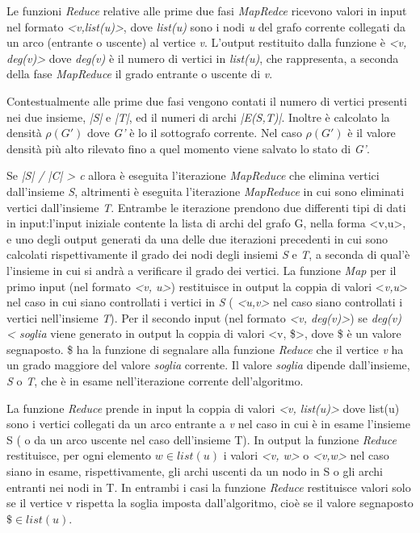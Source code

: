 \documentclass[LaM,binding=0.6cm]{sapthesis}
\begin{document}
Le funzioni \textit{Reduce} relative alle prime due fasi \textit{MapRedce} ricevono valori in input nel formato \textit{<v,list(u)>}, dove \textit{list(u)} sono i nodi  \textit{u} del grafo corrente collegati da un arco (entrante o uscente) al vertice \textit{v}. L'output restituito dalla funzione è \textit{<v, deg(v)>} dove \textit{deg(v)} è il numero di vertici in \textit{list(u)}, che rappresenta, a seconda della fase \textit{MapReduce} il grado entrante o uscente di \textit{v}.

Contestualmente alle prime due fasi vengono contati il numero di vertici presenti nei due insieme, \textit{|S|} e \textit{|T|}, ed il numeri di archi \textit{|E(S,T)|}. Inoltre è calcolato la densità $\rho(G')$ dove \textit{G'} è lo il sottografo corrente. Nel caso $\rho(G')$ è il valore densità più alto rilevato fino a quel momento viene salvato lo stato di \textit{G'}.

Se \textit{|S| / |C| > c} allora è eseguita l'iterazione \textit{MapReduce} che elimina vertici dall'insieme \textit{S}, altrimenti è eseguita l'iterazione \textit{MapReduce} in cui sono eliminati vertici dall'insieme \textit{T}. Entrambe le iterazione prendono due differenti tipi di dati in input:l'input iniziale contente la lista di archi del grafo G, nella forma <v,u>, e uno degli output generati da una delle due iterazioni precedenti in cui sono calcolati rispettivamente il grado dei nodi degli insiemi \textit{S} e \textit{T}, a seconda di qual'è l'insieme in cui si andrà a verificare il grado dei vertici.
La funzione \textit{Map} per il primo input (nel formato \textit{<v, u>}) restituisce in output la coppia di valori <\textit{v,u}> nel caso in cui siano controllati i vertici in \textit{S} ( \textit{<u,v>} nel caso siano controllati i vertici nell'insieme \textit{T}). 
Per il secondo  input (nel formato \textit{<v, deg(v)>}) se \textit{deg(v) < soglia} viene generato in output la coppia di valori <v, \$>, dove \$ è un valore segnaposto. \$ ha la funzione di segnalare alla funzione \textit{Reduce} che il vertice \textit{v} ha un grado maggiore del valore \textit{soglia} corrente. Il valore \textit{soglia} dipende dall'insieme, \textit{S} o \textit{T}, che è in esame nell'iterazione corrente dell'algoritmo.

La funzione \textit{Reduce} prende in input la coppia di valori \textit{<v, list(u)>} dove list(u) sono i vertici collegati da un arco entrante a \textit{v} nel caso in cui è in esame l'insieme S ( o da un arco uscente nel caso dell'insieme T).
In output la funzione \textit{Reduce} restituisce, per ogni elemento \textit{$w \in list(u)$} i valori \textit{<v, w>} o \textit{<v,w>} nel caso siano in esame, rispettivamente, gli archi uscenti da un nodo in S o gli archi entranti nei nodi in T. In entrambi i casi la funzione \textit{Reduce} restituisce valori solo se il vertice v rispetta la soglia imposta dall'algoritmo, cioè se il valore segnaposto \textit{$\$ \in list(u) $}.
\end{document}
